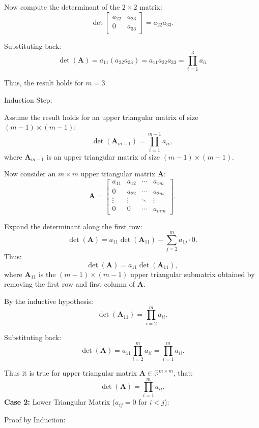 \documentclass[12pt]{article}
\newcommand{\bmat}[1]{\mathbf{#1}} %
\begin{document}
    Now compute the determinant of the \( 2 \times 2 \) matrix:
    \[
    \det
    \begin{bmatrix}
    a_{22} & a_{23} \\
    0 & a_{33}
    \end{bmatrix}
    = a_{22} a_{33}.
    \]
    
    Substituting back:
    \[
    \det(\mathbf{A}) = a_{11} (a_{22} a_{33}) = a_{11} a_{22} a_{33} =  \prod_{i=1}^3 a_{ii}
    \]
    
    Thus, the result holds for \( m = 3 \).
    \vspace{\baselineskip}

    Induction Step:
        
    Assume the result holds for an upper triangular matrix of size \( (m-1) \times (m-1) \):
    \[
    \det(\mathbf{A}_{m-1}) = \prod_{i=1}^{m-1} a_{ii},
    \]
    where \( \mathbf{A}_{m-1} \) is an upper triangular matrix of size \( (m-1) \times (m-1) \).
    
    Now consider an \( m \times m \) upper triangular matrix \( \mathbf{A} \):
    \[
    \mathbf{A} = 
    \begin{bmatrix}
    a_{11} & a_{12} & \cdots & a_{1m} \\
    0 & a_{22} & \cdots & a_{2m} \\
    \vdots & \vdots & \ddots & \vdots \\
    0 & 0 & \cdots & a_{mm}
    \end{bmatrix}.
    \]
    
    Expand the determinant along the first row:
    \[
    \det(\mathbf{A}) = a_{11} \det(\mathbf{A}_{11}) - \sum_{j=2}^m a_{1j} \cdot 0.
    \]
    Thus:
    \[
    \det(\mathbf{A}) = a_{11} \det(\mathbf{A}_{11}),
    \]
    where \( \mathbf{A}_{11} \) is the \((m-1) \times (m-1)\) upper triangular submatrix obtained by removing the first row and first column of \( \mathbf{A} \).
    
    By the inductive hypothesis:
    \[
    \det(\mathbf{A}_{11}) = \prod_{i=2}^m a_{ii}.
    \]
    
    Substituting back:
    \[
    \det(\mathbf{A}) = a_{11} \prod_{i=2}^m a_{ii} = \prod_{i=1}^m a_{ii}.
    \]

    Thus it is true for upper triangular matrix
    \( \bmat{A} \in \mathbb{R}^{m \times m} \), that:
    \[
    \det(\bmat{A}) = \prod_{i=1}^m a_{ii}.
    \] 
    \textbf{Case 2:} Lower Triangular Matrix (\( a_{ij} = 0 \) for \( i < j \)):

    
    Proof by Induction:
    
\end{document}
